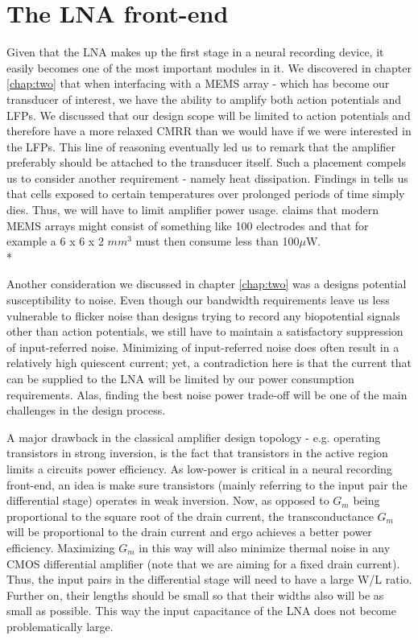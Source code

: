 \chapter{The LNA front-end}
Given that the \acl{LNA} makes up the first stage in a neural recording device, it easily becomes one of the most important modules in it. 
We discovered in chapter \ref{chap:two} that when interfacing with a \acs{MEMS} array - which has become our transducer of interest, we have the ability to amplify both action potentials and \acs{LFP}s. 
We discussed that our design scope will be limited to action potentials and therefore have a more relaxed CMRR than we would have if we were interested in the LFPs. This line of reasoning eventually 
led us to remark that the amplifier preferably should be attached to the transducer itself. Such a placement compels us to consider another requirement - namely heat dissipation. Findings in 
\cite{seese1998characterization} tells us that cells exposed to certain temperatures over prolonged periods of time simply dies. Thus, we will have to limit amplifier power usage. 
\cite{harrison2008design} claims that modern \acs{MEMS} arrays might consist of something like 100 electrodes and that for example a 6 x 6 x 2 $mm^3$ must then consume less than 100$\mu$W. \\*

Another consideration we discussed in chapter \ref{chap:two} was a designs potential susceptibility to noise. Even though our bandwidth requirements leave us less vulnerable to flicker noise than designs 
trying to record any biopotential signals other than action potentials, we still have to maintain a satisfactory suppression of input-referred noise. Minimizing of input-referred noise does often result in
a relatively high quiescent current; yet, a contradiction here is that the current that can be supplied to the LNA will be limited by our power consumption requirements. Alas, finding the best noise power 
trade-off will be one of the main challenges in the design process.

A major drawback in the classical amplifier design topology - e.g. operating transistors in strong inversion, is the fact that transistors in the active region limits a circuits power efficiency. As low-power 
is critical in a neural recording front-end, an idea is make sure transistors (mainly referring to the input pair the differential stage) operates in weak inversion. Now, as opposed to $G_m$ being proportional to the square 
root of the drain current, the transconductance $G_m$ will be proportional to the drain current \cite{harrison2003low} and ergo achieves a better power efficiency. Maximizing $G_m$ in this way will also minimize 
thermal noise in any CMOS differential amplifier \cite{johns2008analog} (note that we are aiming for a fixed drain current).   Thus, the input pairs in the differential stage  will need  to  have a  large  W/L  ratio. Further on, their lengths should be small so that their widths  also will be as small as possible. This way the input capacitance of the LNA does not become problematically large.

